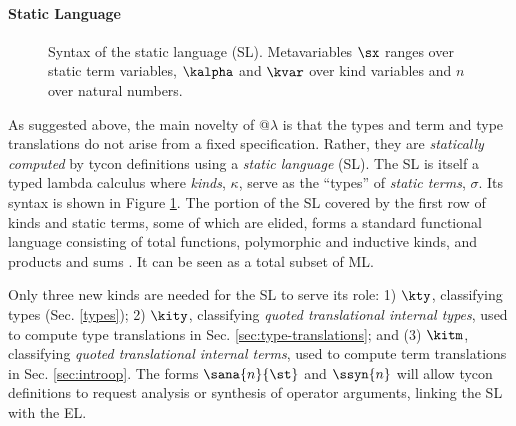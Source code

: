 \paragraph{Static Language}
\begin{figure}[t]
\small
\hspace{-5px}\vspace{-5px}
\caption{Syntax of the static language (SL). Metavariables $\sx$ ranges over static term variables, $\kalpha$ and $\kvar$ over kind variables and $n$ over natural numbers.}
\label{syntax-SL}
\end{figure}
As suggested above, the main novelty of @$\lambda$ is that the types and term and type translations do not arise from a fixed specification. Rather, they are \emph{statically computed} by tycon definitions using a \emph{static language} (SL). The SL is itself a typed lambda calculus where  
\emph{kinds}, $\kappa$, serve as the ``types'' of \emph{static terms}, $\sigma$.  Its syntax is shown in Figure \ref{syntax-SL}. The portion of the SL covered by the first row of kinds and static terms, some of which are elided, forms a standard functional language consisting of total functions, polymorphic and inductive kinds, and products and sums  \cite{pfpl}. It can be seen as a total subset of ML.%

Only three new  kinds are needed for the SL to serve its role: 1) $\kty$, classifying types (Sec. \ref{types}); 2) $\kity$, classifying \emph{quoted translational internal types}, used to {compute} type translations in Sec. \ref{sec:type-translations}; and (3) $\kitm$, classifying \emph{quoted translational internal terms}, used to {compute} term translations in Sec. \ref{sec:introop}. The forms $\sana{n}{\st}$ and $\ssyn{n}$ will  allow tycon definitions to request analysis or synthesis of operator arguments, linking the SL with the  EL.

